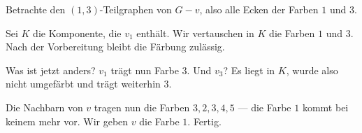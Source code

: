 \begin{merksatz}
Betrachte den $(1,3)$-Teilgraphen von $G-v$, also alle Ecken der Farben $1$ und $3$.

Sei $K$ die Komponente, die $v_1$ enthält. Wir vertauschen in $K$ die Farben $1$ und $3$. Nach der Vorbereitung bleibt die Färbung zulässig.

Was ist jetzt anders? $v_1$ trägt nun Farbe $3$. Und $v_3$? Es liegt  in $K$, wurde also nicht umgefärbt und trägt weiterhin $3$.

Die Nachbarn von $v$ tragen nun die Farben $3, 2, 3, 4, 5$ --- die Farbe $1$ kommt bei keinem mehr vor. Wir geben $v$ die Farbe $1$. Fertig.

\begin{center}
\begin{minipage}{0.88\textwidth}
\end{minipage}
\end{center}
\end{merksatz}

